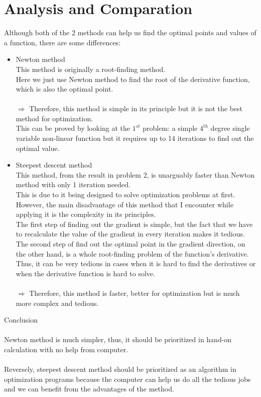 \documentclass[12pt]{article}
\begin{document}
  \part*{Analysis and Comparation}
    Although both of the 2 methods can help us find the optimal points and values of a function, there are some differences:
    \begin{itemize}
      \item Newton method \\
      This method is originally a root-finding method.\\
      Here we just use Newton method to find the root of the derivative function, which is also the optimal point.\\\\
      \(\Rightarrow\) Therefore, this method is simple in its principle but it is not the best method for optimization. \\
      This can be proved by looking at the \(1^{st}\) problem: a simple \(4^{th}\) degree single variable non-linear function but it requires up to 14 iterations to find out the optimal value.

      \item Steepest descent method \\
      This method, from the result in problem 2, is unarguably faster than Newton method with only 1 iteration needed. \\
      This is due to it being designed to solve optimization problems at first. \\
      However, the main disadvantage of this method that I encounter while applying it is the complexity in its principles. \\
      The first step of finding out the gradient is simple, but the fact that we have to recalculate the value of the gradient in every iteration makes it tedious.\\
      The second step of find out the optimal point in the gradient direction, on the other hand, is a whole root-finding problem of the function's derivative. Thus, it can be very tedious in cases when it is hard to find the derivatives or when the derivative function is hard to solve.\\\\
      \(\Rightarrow\) Therefore, this method is faster, better for optimization but is much more complex and tedious.\\
    \end{itemize}
    
  {\LARGE Conclusion}\\\\
  Newton method is much simpler, thus, it should be prioritized in hand-on calculation with no help from computer.\\\\
  Reversely, steepest descent method should be prioritized as an algorithm in optimization programs because the computer can help us do all the tedious jobs and we can benefit from the advantages of the method. 
\end{document}
